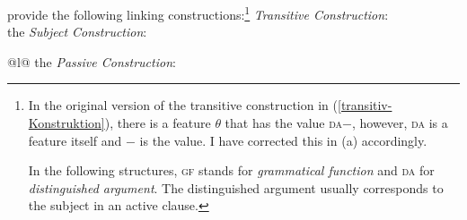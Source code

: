 \citet[--57]{MR2001a} provide the following linking constructions:\footnote{
	In the original version of the transitive construction in (\ref{transitiv-Konstruktion}),
        there is a feature $\theta$ that has the value \textsc{da}$-$, however, \textsc{da} is a
        feature itself and $-$ is the value. I have corrected this in (a) accordingly.
	
	In the following structures, \textsc{gf} stands for \emph{grammatical function} and \textsc{da} for \emph{distinguished argument}. The distinguished argument usually corresponds to the subject in an active clause.%
}
\eal
\label{linking-konstruktionen}
\ex\label{transitiv-Konstruktion} \emph{Transitive Construction}:\\
\ex the \emph{Subject Construction}:\\
\ex 
\begin{tabular}[t]{@{}l@{}}
the \emph{Passive Construction}:\\
\end{tabular}
\zl
